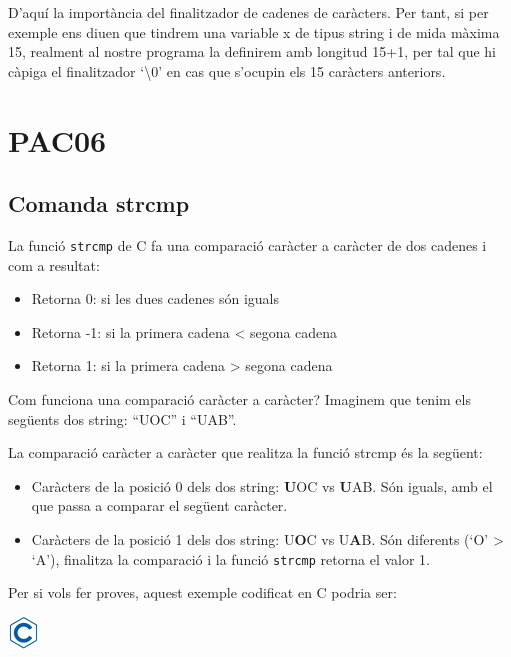 \documentclass[]{book}
\providecommand{\tightlist}{%
  \setlength{\itemsep}{0pt}\setlength{\parskip}{0pt}}
\begin{document}
D'aquí la importància del finalitzador de cadenes de caràcters. Per
tant, si per exemple ens diuen que tindrem una variable x de tipus
string i de mida màxima 15, realment al nostre programa la definirem amb
longitud 15+1, per tal que hi càpiga el finalitzador `\textbackslash{}0'
en cas que s'ocupin els 15 caràcters anteriors.

\chapter{PAC06}\label{pac06}

\section{Comanda strcmp}\label{comanda-strcmp}

La funció \texttt{strcmp} de C fa una comparació caràcter a caràcter de
dos cadenes i com a resultat:

\begin{itemize}
\tightlist
\item
  Retorna 0: si les dues cadenes són iguals
\item
  Retorna -1: si la primera cadena \textless{} segona cadena
\item
  Retorna 1: si la primera cadena \textgreater{} segona cadena
\end{itemize}

Com funciona una comparació caràcter a caràcter? Imaginem que tenim els
següents dos string: ``UOC'' i ``UAB''.

La comparació caràcter a caràcter que realitza la funció strcmp és la
següent:

\begin{itemize}
\tightlist
\item
  Caràcters de la posició 0 dels dos string: \textbf{U}OC vs
  \textbf{U}AB. Són iguals, amb el que passa a comparar el següent
  caràcter.
\item
  Caràcters de la posició 1 dels dos string: U\textbf{O}C vs
  U\textbf{A}B. Són diferents (`O' \textgreater{} `A'), finalitza la
  comparació i la funció \texttt{strcmp} retorna el valor 1.
\end{itemize}

Per si vols fer proves, aquest exemple codificat en C podria ser:

\includegraphics{./img/c.png}
\end{document}
